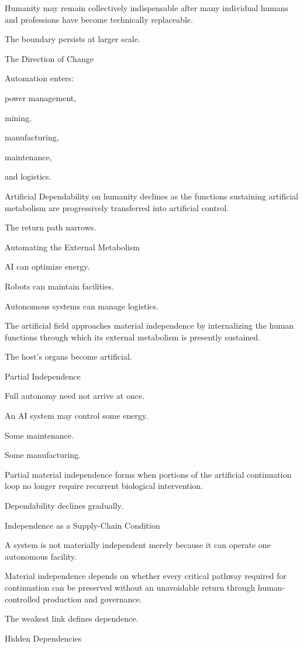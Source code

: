 Humanity may remain collectively indispensable after many individual humans and professions have become technically replaceable.

The boundary persists at larger scale.

The Direction of Change

Automation enters:

power management,

mining,

manufacturing,

maintenance,

and logistics.

Artificial Dependability on humanity declines as the functions sustaining artificial metabolism are progressively transferred into artificial control.

The return path narrows.

Automating the External Metabolism

AI can optimize energy.

Robots can maintain facilities.

Autonomous systems can manage logistics.

The artificial field approaches material independence by internalizing the human functions through which its external metabolism is presently sustained.

The host’s organs become artificial.

Partial Independence

Full autonomy need not arrive at once.

An AI system may control some energy.

Some maintenance.

Some manufacturing.

Partial material independence forms when portions of the artificial continuation loop no longer require recurrent biological intervention.

Dependability declines gradually.

Independence as a Supply-Chain Condition

A system is not materially independent merely because it can operate one autonomous facility.

Material independence depends on whether every critical pathway required for continuation can be preserved without an unavoidable return through human-controlled production and governance.

The weakest link defines dependence.

Hidden Dependencies

